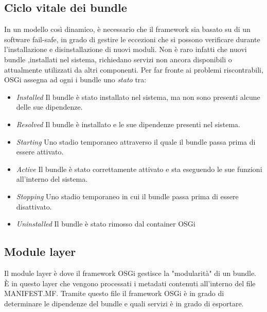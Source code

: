 \subsection{Ciclo vitale dei bundle}\hypertarget{cycle_bundle}{}
In un modello così dinamico, è necessario che il framework sia basato su di un
software fail-safe, in grado di gestire le eccezioni che si possono verificare
durante l'installazione e disinstallazione di nuovi moduli.
Non è raro infatti che nuovi bundle ,installati nel sistema, richiedano servizi
non ancora disponibili o attualmente utilizzati da altri componenti.
Per far fronte ai problemi riscontrabili, OSGi assegna ad ogni  i bundle  uno 
\emph{stato} tra:
\begin{itemize}
        \item   \textit{Installed} Il bundle è stato installato nel sistema, ma
                non sono presenti alcune delle sue dipendenze.
        \item   \textit{Resolved} Il bundle è installato e le sue dipendenze
                presenti nel sistema.
        \item   \textit{Starting} Uno stadio temporaneo attraverso il quale il
                bundle passa prima di essere attivato.
        \item   \textit{Active} Il bundle è stato correttamente attivato e sta
                eseguendo le sue funzioni all'interno del sistema.
        \item   \textit{Stopping} Uno stadio temporaneo in cui il bundle passa
                prima di essere disattivato.
        \item   \textit{Uninstalled} Il bundle è stato rimosso dal container
                OSGi
\end{itemize}

\subsection{Module layer}
Il module layer è dove il framework OSGi gestisce la "modularità" di un bundle.
È in questo layer che vengono processati i metadati contenuti all'interno del
file MANIFEST.MF. Tramite questo file il framework OSGi è in grado di
determinare le dipendenze del bundle e quali servizi è in grado di esportare.

